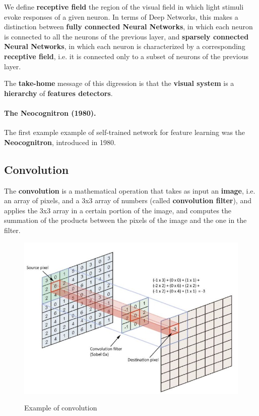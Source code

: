 We define \textbf{receptive field} the region of the visual field in which light stimuli evoke responses of a given neuron. In terms of Deep Networks, this makes a distinction between \textbf{fully connected Neural Networks}, in which each neuron is connected to all the neurons of the previous layer, and \textbf{sparsely connected Neural Networks}, in which each neuron is characterized by a corresponding \textbf{receptive field}, i.e. it is connected only to a subset of neurons of the previous layer.

The \textbf{take-home} message of this digression is that the \textbf{visual system} is a \textbf{hierarchy} of \textbf{features detectors}.

\paragraph{The Neocognitron (1980).} The first example example of self-trained network for feature learning was the \textbf{Neocognitron}, introduced in 1980.

\subsection{Convolution}
The \textbf{convolution} is a mathematical operation that takes as input an \textbf{image}, i.e. an array of pixels, and a 3x3 array of numbers (called \textbf{convolution filter}), and applies the 3x3 array in a certain portion of the image, and computes the summation of the products between the pixels of the image and the one in the filter. 

\begin{figure}[h!]
		\centering
        \includegraphics[scale = 1.5]{img/convolution.jpg}
		\label{mi}
        \caption{Example of convolution}
\end{figure}

